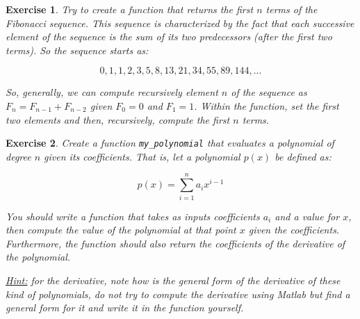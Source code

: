 \documentclass[a4paper,12pt]{article}
\newtheorem{exercise}{Exercise}
\begin{document}
\begin{exercise}
Try to create a function that returns the first $n$ terms of the Fibonacci sequence. This sequence is characterized by the fact that each successive element of the sequence is the sum of its two predecessors (after the first two terms). So the sequence starts as:

\[
0, 1, 1, 2, 3, 5, 8, 13, 21, 34, 55, 89, 144,...
\]

So, generally, we can compute recursively element $n$ of the sequence as $F_n = F_{n-1}+F_{n-2}$ given $F_0 = 0$ and $F_1 = 1$. Within the function, set the first two elements and then, recursively, compute the first $n$ terms.
\end{exercise}

\begin{exercise}
Create a function \texttt{my_polynomial} that evaluates a polynomial of degree $n$ given its coefficients. That is, let a polynomial $p(x)$ be defined as:
	
	\[
	p(x) = \sum^n_{i=1}a_i x^{i-1}
	\]	
	
	You should write a function that takes as inputs coefficients $a_i$ and a value for $x$, then compute the value of the polynomial at that point $x$ given the coefficients. Furthermore, the function should also return the coefficients of the derivative of the polynomial.
	
	\textit{\underline{Hint:} for the derivative, note how is the general form of the derivative of these kind of polynomials, do not try to compute the derivative using Matlab but find a general form for it and write it in the function yourself.}
\end{exercise}
\end{document}
